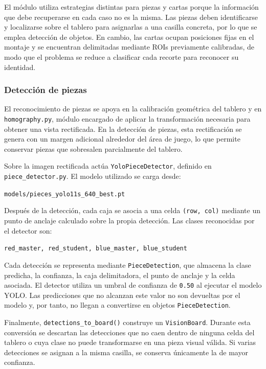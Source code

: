 El módulo utiliza estrategias distintas para piezas y cartas porque la información que debe recuperarse en cada caso no es la misma. Las piezas deben identificarse y localizarse sobre el tablero para asignarlas a una casilla concreta, por lo que se emplea detección de objetos. En cambio, las cartas ocupan posiciones fijas en el montaje y se encuentran delimitadas mediante ROIs previamente calibradas, de modo que el problema se reduce a clasificar cada recorte para reconocer su identidad.

\subsubsection{Detección de piezas}

El reconocimiento de piezas se apoya en la calibración geométrica del tablero y en \texttt{homography.py}, módulo encargado de aplicar la transformación necesaria para obtener una vista rectificada. En la detección de piezas, esta rectificación se genera con un margen adicional alrededor del área de juego, lo que permite conservar piezas que sobresalen parcialmente del tablero.

Sobre la imagen rectificada actúa \texttt{YoloPieceDetector}, definido en \\ \texttt{piece\_detector.py}. El modelo utilizado se carga desde:

\begin{center}
\texttt{models/pieces\_yolo11s\_640\_best.pt}
\end{center}

Después de la detección, cada caja se asocia a una celda \texttt{(row, col)} mediante un punto de anclaje calculado sobre la propia detección. Las clases reconocidas por el detector son:

\begin{center}
\texttt{red\_master, red\_student, blue\_master, blue\_student}
\end{center}

Cada detección se representa mediante \texttt{PieceDetection}, que almacena la clase predicha, la confianza, la caja delimitadora, el punto de anclaje y la celda asociada. El detector utiliza un umbral de confianza de \texttt{0.50} al ejecutar el modelo YOLO. Las predicciones que no alcanzan este valor no son devueltas por el modelo y, por tanto, no llegan a convertirse en objetos \texttt{PieceDetection}.

Finalmente, \texttt{detections\_to\_board()} construye un \texttt{VisionBoard}. Durante esta conversión se descartan las detecciones que no caen dentro de ninguna celda del tablero o cuya clase no puede transformarse en una pieza visual válida. Si varias detecciones se asignan a la misma casilla, se conserva únicamente la de mayor confianza.

